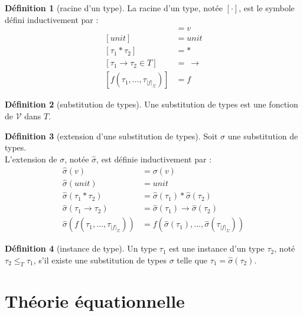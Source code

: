 \documentclass [a4paper] {report}
\theoremstyle {definition}
\newtheorem {definition} {Définition} [section]
\newcommand {\V} {\mathscr V}
\begin{document}
\begin {definition} [racine d'un type]
	La racine d'un type, notée $[ \cdot ]$, est le symbole défini inductivement par :
	\begin {align*}
		[ v ] &= v \\
		[ unit ] &= unit \\
		[ \tau_1 * \tau_2 ] &= * \\
		[ \tau_1 \rightarrow \tau_2 \in T ] &=\ \rightarrow \\
		[ f (\tau_1, \dots, \tau_{|f|_\Sigma}) ] &= f
	\end {align*}
\end {definition}

\begin {definition} [substitution de types]
	Une substitution de types est une fonction de $\V$ dans $T$.
\end {definition}

\begin {definition} [extension d'une substitution de types]
	Soit $\sigma$ une substitution de types. \\
	L'extension de $\sigma$, notée $\hat \sigma$, est définie inductivement par :
	\begin {align*}
		\hat \sigma (v) &= \sigma (v) \\
		\hat \sigma (unit) &= unit \\
		\hat \sigma (\tau_1 * \tau_2) &= \hat \sigma (\tau_1) * \hat \sigma (\tau_2) \\
		\hat \sigma (\tau_1 \rightarrow \tau_2) &= \hat \sigma (\tau_1) \rightarrow \hat \sigma (\tau_2) \\
		\hat \sigma (f (\tau_1, \dots, \tau_{|f|_\Sigma})) &= f (\hat \sigma (\tau_1), \dots, \hat \sigma (\tau_{|f|_\Sigma}))
	\end {align*}
\end {definition}

\begin {definition} [instance de type]
	Un type $\tau_1$ est une instance d'un type $\tau_2$, noté $\tau_2 \leqslant_T \tau_1$, s'il existe une substitution de types $\sigma$  telle que $\tau_1 = \hat \sigma (\tau_2)$.
\end {definition}


\section {Théorie équationnelle}
\end{document}
